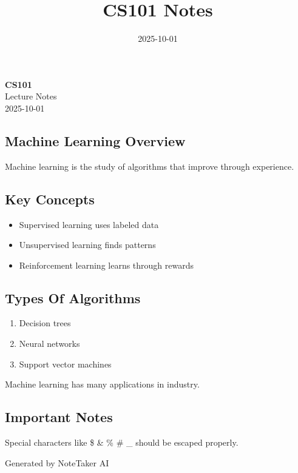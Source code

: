\documentclass[11pt,a4paper]{article}
\title{\textcolor{primarycolor}{\Huge\textbf{CS101 Notes}}}
\author{}
\date{\textcolor{secondarycolor}{2025-10-01}}
\begin{document}
\begin{center}
    \colorbox{secondarycolor!10}{%
        \parbox{0.95\textwidth}{%
            \centering
            \vspace{0.5cm}
            {\Huge\textcolor{primarycolor}{\textbf{CS101}}} \\[0.5cm]
            {\Large Lecture Notes} \\[0.3cm]
            {\large\textcolor{secondarycolor}{2025-10-01}}
            \vspace{0.5cm}
        }
    }
\end{center}

\vspace{1cm}

\subsection*{Machine Learning Overview}

Machine learning is the study of algorithms that improve through experience.

\subsection*{Key Concepts}

\begin{itemize}
  \item Supervised learning uses labeled data
  \item Unsupervised learning finds patterns
  \item Reinforcement learning learns through rewards
\end{itemize}

\subsection*{Types Of Algorithms}

\begin{enumerate}
  \item Decision trees
  \item Neural networks
  \item Support vector machines
\end{enumerate}

Machine learning has many applications in industry.

\subsection*{Important Notes}

Special characters like \$ \& \% \# \_ should be escaped properly.

\vspace{1cm}

\begin{center}
\textcolor{secondarycolor}{\small Generated by NoteTaker AI}
\end{center}
\end{document}

